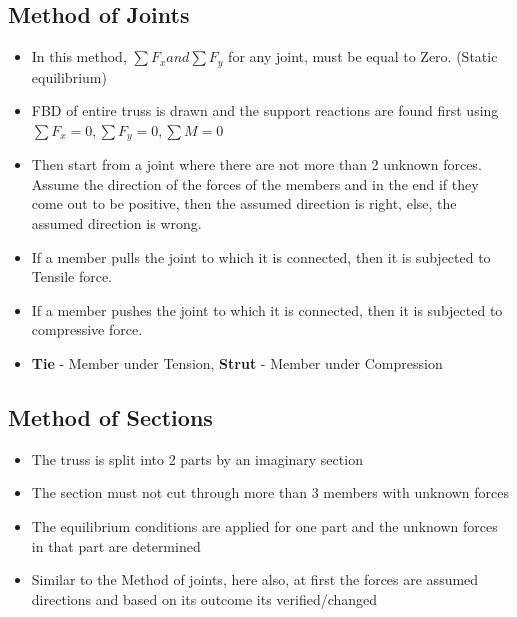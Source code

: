 \documentclass[8pt]{report}
\begin{document}
\subsection{Method of Joints}
	\begin{itemize}
		\item In this method, $\sum F_x and \sum F_y$ for any joint, must be equal to Zero. (Static equilibrium)
		\item FBD of entire truss is drawn and the support reactions are found first using $\sum F_x = 0, \sum F_y=0, \sum M=0$
		\item Then start from a joint where there are not more than 2 unknown forces. Assume the direction of the forces of the members and in the end if they come out to be positive, then the assumed direction is right, else, the assumed direction is wrong.
		\item If a member pulls the joint to which it is connected, then it is subjected to Tensile force.
		\item If a member pushes the joint to which it is connected, then it is subjected to compressive force.
		\item \textbf{Tie} - Member under Tension, \textbf{Strut} - Member under Compression
	\end{itemize}\hrulefill
\subsection{Method of Sections}
	\begin{itemize}
		\item The truss is split into 2 parts by an imaginary section
		\item The section must not cut through more than 3 members with unknown forces
		\item The equilibrium conditions are applied for one part and the unknown forces in that part are determined
		\item Similar to the Method of joints, here also, at first the forces are assumed directions and based on its outcome its verified/changed
	\end{itemize}\hrulefill
\end{document}

